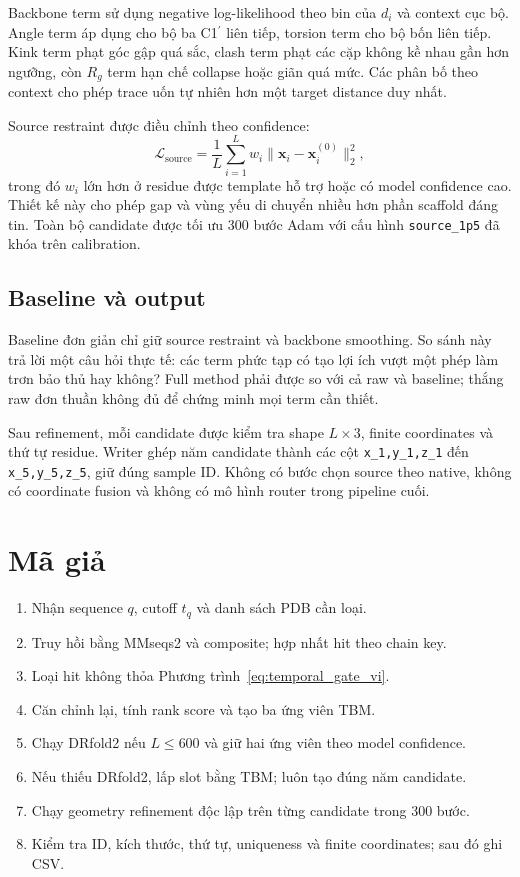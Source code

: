\documentclass[12pt,a4paper,oneside]{report}
\newcommand{\cprime}{C1$^{\prime}$}
\begin{document}
Backbone term sử dụng negative log-likelihood theo bin của $d_i$ và context cục bộ.
Angle term áp dụng cho bộ ba \cprime{} liên tiếp, torsion term cho bộ bốn liên tiếp. Kink
term phạt góc gập quá sắc, clash term phạt các cặp không kề nhau gần hơn ngưỡng, còn
$R_g$ term hạn chế collapse hoặc giãn quá mức. Các phân bố theo context cho phép trace
uốn tự nhiên hơn một target distance duy nhất.

Source restraint được điều chỉnh theo confidence:
\begin{equation}
\mathcal{L}_{\mathrm{source}}=
\frac{1}{L}\sum_{i=1}^{L}w_i
\lVert \mathbf{x}_i-\mathbf{x}^{(0)}_i\rVert_2^2,
\end{equation}
trong đó $w_i$ lớn hơn ở residue được template hỗ trợ hoặc có model confidence cao.
Thiết kế này cho phép gap và vùng yếu di chuyển nhiều hơn phần scaffold đáng tin. Toàn
bộ candidate được tối ưu 300 bước Adam với cấu hình \texttt{source\_1p5} đã khóa trên
calibration.

\subsection{Baseline và output}

Baseline đơn giản chỉ giữ source restraint và backbone smoothing. So sánh này trả lời
một câu hỏi thực tế: các term phức tạp có tạo lợi ích vượt một phép làm trơn bảo thủ hay
không? Full method phải được so với cả raw và baseline; thắng raw đơn thuần không đủ để
chứng minh mọi term cần thiết.

Sau refinement, mỗi candidate được kiểm tra shape $L\times3$, finite coordinates và thứ
tự residue. Writer ghép năm candidate thành các cột \texttt{x\_1,y\_1,z\_1} đến
\texttt{x\_5,y\_5,z\_5}, giữ đúng sample ID. Không có bước chọn source theo native,
không có coordinate fusion và không có mô hình router trong pipeline cuối.

\section{Mã giả}

\begin{enumerate}
  \item Nhận sequence $q$, cutoff $t_q$ và danh sách PDB cần loại.
  \item Truy hồi bằng MMseqs2 và composite; hợp nhất hit theo chain key.
  \item Loại hit không thỏa Phương trình~\ref{eq:temporal_gate_vi}.
  \item Căn chỉnh lại, tính rank score và tạo ba ứng viên TBM.
  \item Chạy DRfold2 nếu $L\leq600$ và giữ hai ứng viên theo model confidence.
  \item Nếu thiếu DRfold2, lấp slot bằng TBM; luôn tạo đúng năm candidate.
  \item Chạy geometry refinement độc lập trên từng candidate trong 300 bước.
  \item Kiểm tra ID, kích thước, thứ tự, uniqueness và finite coordinates; sau đó ghi CSV.
\end{enumerate}
\end{document}
